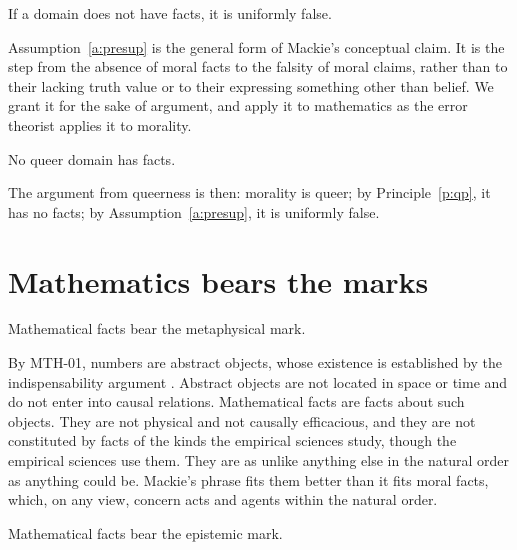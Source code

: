 \documentclass{situationist-preprint}
\begin{document}
\begin{assumption}[Presupposition]\label{a:presup}
If a domain does not have facts, it is uniformly false.
\end{assumption}

Assumption~\ref{a:presup} is the general form of Mackie's conceptual claim. It is the step from the absence of moral facts to the falsity of moral claims, rather than to their lacking truth value or to their expressing something other than belief. We grant it for the sake of argument, and apply it to mathematics as the error theorist applies it to morality.

\begin{principle}\label{p:qp}
No queer domain has facts.
\end{principle}

The argument from queerness is then: morality is queer; by Principle~\ref{p:qp}, it has no facts; by Assumption~\ref{a:presup}, it is uniformly false.

\section{Mathematics bears the marks}\label{s:math}

\begin{assumption}\label{a:met}
Mathematical facts bear the metaphysical mark.
\end{assumption}

By MTH-01, numbers are abstract objects, whose existence is established by the indispensability argument \citep{Quine1948,Putnam1971,Colyvan2001}. Abstract objects are not located in space or time and do not enter into causal relations. Mathematical facts are facts about such objects. They are not physical and not causally efficacious, and they are not constituted by facts of the kinds the empirical sciences study, though the empirical sciences use them. They are as unlike anything else in the natural order as anything could be. Mackie's phrase fits them better than it fits moral facts, which, on any view, concern acts and agents within the natural order.

\begin{assumption}\label{a:epi}
Mathematical facts bear the epistemic mark.
\end{assumption}
\end{document}
